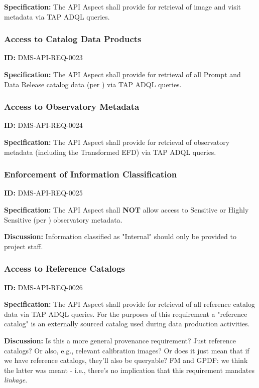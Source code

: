 \documentclass[SE,toc]{lsstdoc}
\begin{document}
\textbf{Specification:}
The API Aspect shall provide for retrieval of image and visit metadata via TAP ADQL queries.

\subsubsection{Access to Catalog Data Products}

\label{DMS-API-REQ-0023}
\textbf{ID:} DMS-API-REQ-0023

\textbf{Specification:}
The API Aspect shall provide for retrieval of all Prompt and Data Release catalog data (per ) via TAP ADQL queries.

\subsubsection{Access to Observatory Metadata}

\label{DMS-API-REQ-0024}
\textbf{ID:} DMS-API-REQ-0024

\textbf{Specification:}
The API Aspect shall provide for retrieval of observatory metadata (including the Transformed EFD) via TAP ADQL queries.

\subsubsection{Enforcement of Information Classification}

\label{DMS-API-REQ-0025}
\textbf{ID:} DMS-API-REQ-0025

\textbf{Specification:}
The API Aspect shall \textbf{NOT} allow access to Sensitive or Highly Sensitive (per ) observatory metadata.

\textbf{Discussion:}
Information classified as "Internal" should only be provided to project staff.

\subsubsection{Access to Reference Catalogs}

\label{DMS-API-REQ-0026}
\textbf{ID:} DMS-API-REQ-0026

\textbf{Specification:}
The API Aspect shall provide for retrieval of all reference catalog data via TAP ADQL queries.  For the purposes of this requirement a "reference catalog" is an externally sourced catalog used during data production activities.

\textbf{Discussion:}
Is this a more general provenance requirement? Just reference catalogs? Or also, e.g., relevant calibration images? Or does it just mean that if we have reference catalogs, they'll also be queryable? FM and GPDF: we think the latter was meant - i.e., there's no implication that this requirement mandates \textit{linkage}.
\end{document}
